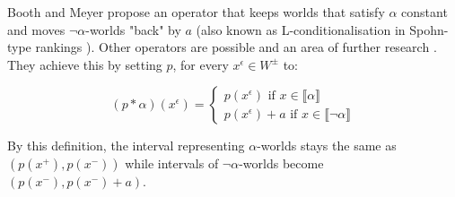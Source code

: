 \documentclass[english, 12pt]{scrartcl}
\theoremstyle{definition}
\theoremstyle{definition}
\theoremstyle{definition}
\newcommand{\modelsOf}[1]{\llbracket #1 \rrbracket}
\begin{document}
Booth and Meyer propose an operator that keeps worlds that satisfy $\alpha$ constant and moves $\neg\alpha$-worlds "back" by $a$ (also known as L-conditionalisation in Spohn-type rankings \cite{Geffner1992}). Other operators are possible and an area of further research \cite{Booth2011}. They achieve this by setting $p$, for every $x^{\epsilon} \in W^{\pm}$ to:
    
\begin{equation*}
    (p \ast \alpha)(x^{\epsilon}) = \left\{
                    \begin{array}{ll}
                      p(x^{\epsilon}) \textrm{ if } x \in \modelsOf{\alpha}\\
                      p(x^{\epsilon}) + a \textrm{ if } x \in \modelsOf{\neg\alpha}
                    \end{array}
                  \right.
\end{equation*}

By this definition, the interval representing $\alpha$-worlds stays the same as $(p(x^{+}), p(x^{-}))$ while intervals of $\neg\alpha$-worlds become $(p(x^{-}), p(x^{-}) + a)$.
\end{document}
